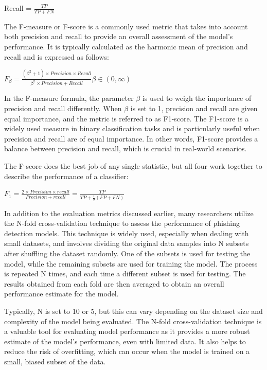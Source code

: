 \documentclass[final]{cvpr}
\begin{document}
Recall = $\frac{TP}
{TP+FN}$ 

\vspace{7pt}

The F-measure or F-score is a commonly used metric that takes into account both precision and recall to provide an overall assessment of the model's performance. It is typically calculated as the harmonic mean of precision and recall and is expressed as follows:

\vspace{7pt}

$F_{\beta} = \frac{(\beta^2 + 1)\times Precision \times Recall}
{\beta^2 \times Precision + Recall} \beta \in (0, \infty) $
\vspace{7pt}

In the F-measure formula, the parameter $\beta$ is used to weigh the importance of precision and recall differently. When $\beta$ is set to 1, precision and recall are given equal importance, and the metric is referred to as F1-score. The F1-score is a widely used measure in binary classification tasks and is particularly useful when precision and recall are of equal importance. In other words, F1-score provides a balance between precision and recall, which is crucial in real-world scenarios.

The F-score does the best job of any single statistic, but all four work together to describe the performance of a classifier:

\vspace{7pt}

$F_1 = \frac{2 \times Precision \times recall}
{Precision + recall} = \frac{TP}{TP + \frac{1}{2} (FP + FN)}$

\vspace{7pt}

In addition to the evaluation metrics discussed earlier, many researchers utilize the N-fold cross-validation technique to assess the performance of phishing detection models. This technique is widely used, especially when dealing with small datasets, and involves dividing the original data samples into N subsets after shuffling the dataset randomly. One of the subsets is used for testing the model, while the remaining subsets are used for training the model. The process is repeated N times, and each time a different subset is used for testing. The results obtained from each fold are then averaged to obtain an overall performance estimate for the model. 

Typically, N is set to 10 or 5, but this can vary depending on the dataset size and complexity of the model being evaluated. The N-fold cross-validation technique is a valuable tool for evaluating model performance as it provides a more robust estimate of the model's performance, even with limited data. It also helps to reduce the risk of overfitting, which can occur when the model is trained on a small, biased subset of the data.
\end{document}
